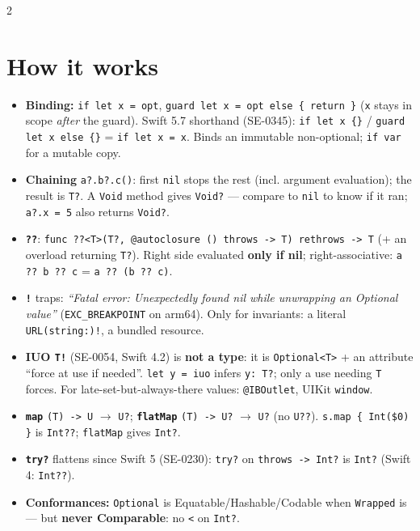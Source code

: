 \documentclass[8pt]{extarticle}
\newcommand\QQ{\hbox{?}\hbox{?}}
\newcommand\qq{\texttt{\QQ}}
\newcommand\arr{\texttt{\hbox{-}\hbox{>}}}
\begin{document}
\begin{multicols}{2}
\raggedright

\section{How it works}
\begin{itemize}
  \item \textbf{Binding:} \texttt{if let x = opt}, \texttt{guard let x = opt else \{ return \}}
        (\texttt{x} stays in scope \emph{after} the guard). Swift 5.7 shorthand
        (SE-0345): \texttt{if let x \{\}} / \texttt{guard let x else \{\}} = \texttt{if let x = x}.
        Binds an immutable non-optional; \texttt{if var} for a mutable copy.
  \item \textbf{Chaining} \texttt{a?.b?.c()}: first \texttt{nil} stops the rest (incl.
        argument evaluation); the result is \texttt{T?}. A \texttt{Void} method gives
        \texttt{Void?} — compare to \texttt{nil} to know if it ran; \texttt{a?.x = 5}
        also returns \texttt{Void?}.
  \item \textbf{\qq}: \texttt{func \QQ<T>(T?, @autoclosure () throws \arr{} T) rethrows \arr{} T}
        (+ an overload returning \texttt{T?}). Right side evaluated \textbf{only if nil};
        right-associative: \texttt{a \QQ{} b \QQ{} c} = \texttt{a \QQ{} (b \QQ{} c)}.
  \item \textbf{\texttt{!}} traps: \emph{``Fatal error: Unexpectedly found nil while
        unwrapping an Optional value''} (\texttt{EXC\_BREAKPOINT} on arm64). Only for
        invariants: a literal \texttt{URL(string:)!}, a bundled resource.
  \item \textbf{IUO \texttt{T!}} (SE-0054, Swift 4.2) is \textbf{not a type}: it is
        \texttt{Optional<T>} + an attribute ``force at use if needed''. \texttt{let y = iuo}
        infers \texttt{y: T?}; only a use needing \texttt{T} forces. For
        late-set-but-always-there values: \texttt{@IBOutlet}, UIKit \texttt{window}.
  \item \textbf{\texttt{map}} \texttt{(T) \arr{} U} $\to$ \texttt{U?};
        \textbf{\texttt{flatMap}} \texttt{(T) \arr{} U?} $\to$ \texttt{U?} (no \texttt{U\QQ}).
        \texttt{s.map \{ Int(\$0) \}} is \texttt{Int\QQ}; \texttt{flatMap} gives \texttt{Int?}.
  \item \textbf{\texttt{try?}} flattens since Swift 5 (SE-0230): \texttt{try?} on
        \texttt{throws \arr{} Int?} is \texttt{Int?} (Swift 4: \texttt{Int\QQ}).
  \item \textbf{Conformances:} \texttt{Optional} is Equatable/Hashable/Codable when
        \texttt{Wrapped} is — but \textbf{never Comparable}: no \texttt{<} on \texttt{Int?}.
\end{itemize}


\end{multicols}
\end{document}

